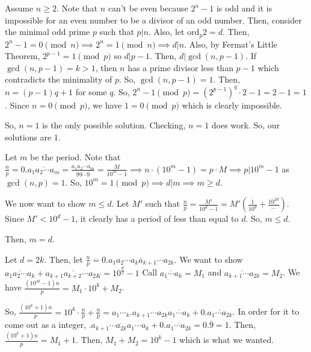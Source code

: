 \documentclass[11pt]{article}
\begin{document}
\begin{sol}
Assume $n\ge 2$. Note that $n$ can't be even because $2^{n}-1$ is odd and it is impossible for an even number to be a divisor of an odd number. Then, consider the minimal odd prime $p$ such that $p|n$. Also, let $\text{ord}_{p} 2 =d$. Then, $2^{n}-1=0\pmod{n} \implies 2^{n}=1\pmod{n}\implies d|n$. Also, by Fermat's Little Theorem, $2^{p-1}=1\pmod{p}$ so $d|p-1$. Then, $d|\gcd(n,p-1)$. If $\gcd(n,p-1)=k>1$, then $n$ has a prime divisor less than $p-1$ which contradicts the minimality of $p$. So, $\gcd(n,p-1)=1$. Then, $n=(p-1)q+1$ for some $q$. So, $2^{n}-1\pmod{p}=(2^{p-1})^{q}\cdot 2-1=2-1=1$. Since $n=0\pmod{p}$, we have $1=0\pmod{p}$ which is clearly impossible.

So, $n=1$ is the only possible solution. Checking, $n=1$ does work. So, our solutions are $\boxed{1}$.
\end{sol}


\begin{sol}[1]
Let $m$ be the period. Note that $\frac{n}{p}=0.\overline{a_{1}a_{2}\cdots a_{m}}=\frac{a_{1}a_{2}\cdots a_{m}}{\overline{99\cdots 9}}=\frac{M}{10^{m}-1}\implies n\cdot (10^{m}-1)=p\cdot M\implies p|10^{m}-1$ as $\gcd(n,p)=1$. So, $10^{m}=1\pmod{p}\implies d|m\implies m\ge d$.

We now want to show $m\leq d$. Let $M'$ such that $\frac{n}{p}=\frac{M'}{10^{d}-1}=M'(\frac{1}{10^d}+\frac{10^{2d}}\cdots)$. Since $M'< 10^{d}-1$, it clearly has a period of less than equal to $d$. So, $m\leq d$.

Then, $m=d$.
\end{sol}

\begin{sol}[2]
Let $d=2k$. Then, let $\frac{n}{p}=0.\overline{a_{1}a_{2}\cdots a_{k}a_{k+1}\cdots a_{2k}}$. We want to show $\overline{a_{1}a_{2}\cdots a_{k}} + \overline{a_{k+1}a_{k+2}\cdots a_{2K}} = 10^{\frac{d}{2}}-1$ Call $\overline{a_{1}\cdots a_{k}}=M_{1}$ and $\overline{a_{k+1}\cdots a_{2k}}=M_{2}$. We have $\frac{(10^{2k}-1)n}{p}=M_{1}\cdot 10^{k}+M_{2}$.

So, $\frac{(10^{k}+1)n}{p}=10^{k}\cdot \frac{n}{p}+\frac{n}{p}=a_{1}\cdots_{k}.a_{k+1}\cdots a_{2k}\overline{a_{1}\cdots a_{k}} + 0.\overline{a_{1}\cdots a_{2k}}$. In order for it to come out as a integer, $.\overline{a_{k+1}\cdots a_{2k}a_{1}\cdots a_{k}}+0.\overline{a_{1}\cdots a_{2k}}=0.\overline{9}=1$.  Then, $\frac{(10^{k}+1)n}{p}=M_{1}+1$.  Then, $M_{1}+M_{2}=10^{k}-1$ which is what we wanted.
\end{sol}
\end{document}
